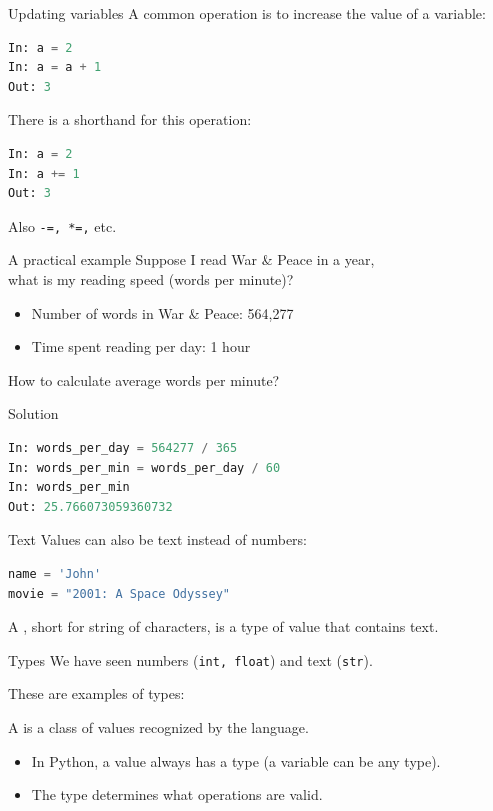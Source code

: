 \documentclass[aspectratio=169,usenames,dvipsnames]{beamer}
\begin{document}
\begin{frame}[fragile]{Updating variables}
A common operation is to increase the value of a variable:
\begin{lstlisting}[language=python]
In: a = 2
In: a = a + 1
Out: 3
\end{lstlisting}

\pause
There is a shorthand for this operation:
\begin{lstlisting}[language=python]
In: a = 2
In: a += 1
Out: 3
\end{lstlisting}

Also \lstinline{-=, *=,} etc.
\end{frame}


\begin{frame}{A practical example}
    Suppose I read War \& Peace in a year, \\
    what is my reading speed (words per minute)?
    \begin{itemize}
        \item Number of words in War \& Peace: 564,277
        \item Time spent reading per day: 1 hour
    \end{itemize}
    How to calculate average words per minute?
\end{frame}

\begin{frame}[fragile]{Solution}
\begin{lstlisting}[language=python]
In: words_per_day = 564277 / 365
In: words_per_min = words_per_day / 60
In: words_per_min
Out: 25.766073059360732
\end{lstlisting}
\end{frame}


\begin{frame}[fragile]{Text}
Values can also be text instead of numbers:
\begin{lstlisting}[language=python]
name = 'John'
movie = "2001: A Space Odyssey"
\end{lstlisting}

\pause
    \begin{definition}
        A , short for string of characters,
        is a type of value that contains text.
    \end{definition}
\end{frame}

\begin{frame}{Types}
    We have seen numbers (\lstinline{int, float}) and text (\lstinline{str}).

    These are examples of types:

    \begin{definition}
        A  is a class of values recognized by the language.
    \end{definition}
    
    \pause
    \begin{itemize}
        \item In Python, a value always has a type (a variable can be any type).
        \item The type determines what operations are valid.
    \end{itemize}
\end{frame}
\end{document}
